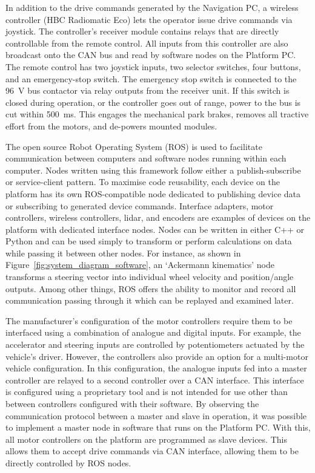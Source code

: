 \documentclass[preprint,authoryear,12pt]{elsarticle}
\begin{document}
        In addition to the drive commands generated by the Navigation PC, a wireless controller (HBC Radiomatic Eco) lets the operator issue drive commands via joystick.
        The controller's receiver module contains relays that are directly controllable from the remote control.
        All inputs from this controller are also broadcast onto the CAN bus and read by software nodes on the Platform PC.
        The remote control has two joystick inputs, two selector switches, four buttons, and an emergency-stop switch.
        The emergency stop switch is connected to the \SI{96}{\volt} bus contactor via relay outputs from the receiver unit.
        If this switch is closed during operation, or the controller goes out of range, power to the bus is cut within \SI{500}{\milli\second}.
        This engages the mechanical park brakes, removes all tractive effort from the motors, and de-powers mounted modules.

        The open source Robot Operating System (ROS) is used to facilitate communication between computers and software nodes running within each computer.
        Nodes written using this framework follow either a publish-subscribe or service-client pattern.
        To maximise code reusability, each device on the platform has its own ROS-compatible node dedicated to publishing device data or subscribing to generated device commands.
        Interface adapters, motor controllers, wireless controllers, lidar, and encoders are examples of devices on the platform with dedicated interface nodes.
        Nodes can be written in either C++ or Python and can be used simply to transform or perform calculations on data while passing it between other nodes.
        For instance, as shown in Figure~\ref{fig:system_diagram_software}, an `Ackermann kinematics' node transforms a steering vector into individual wheel velocity and position/angle outputs.
        Among other things, ROS offers the ability to monitor and record all communication passing through it which can be replayed and examined later.

        The manufacturer's configuration of the motor controllers require them to be interfaced using a combination of analogue and digital inputs.
        For example, the accelerator and steering inputs are controlled by potentiometers actuated by the vehicle's driver.
        However, the controllers also provide an option for a multi-motor vehicle configuration.
        In this configuration, the analogue inputs fed into a master controller are relayed to a second controller over a CAN interface.
        This interface is configured using a proprietary tool and is not intended for use other than between controllers configured with their software.
        By observing the communication protocol between a master and slave in operation, it was possible to implement a master node in software that runs on the Platform PC.
        With this, all motor controllers on the platform are programmed as slave devices.
        This allows them to accept drive commands via CAN interface, allowing them to be directly controlled by ROS nodes.
\end{document}
